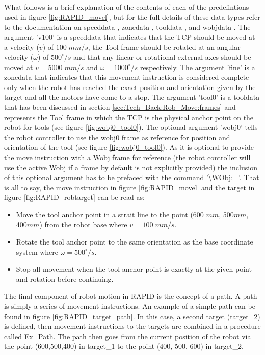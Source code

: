 \documentclass{cslthse-msc}
\begin{document}
What follows is a brief explanation of the contents of each of the predefintions used in figure \ref{fig:RAPID_movel}, but for the full details of these data types refer to the documentation on speeddata \cite[Sec. 3.76]{ABB:rapid_instructions}, zonedata \cite[Sec. 3.103]{ABB:rapid_instructions}, tooldata \cite[Sec. 3.88]{ABB:rapid_instructions}, and wobjdata \cite[Sec. 3.100]{ABB:rapid_instructions}. The argument 'v100' is a speeddata that indicates that the TCP should be moved at a velocity ($v$) of $100 \; mm/s$, the Tool frame should be rotated at an angular velocity ($\omega$) of $500^\circ /s$ and that any linear or rotational external axes should be moved at $v = 5000 \; mm /s$ and $\omega = 1000^\circ /s$ respectively. The argument 'fine' is a zonedata that indicates that this movement instruction is considered complete only when the robot has reached the exact position and orientation given by the target and all the motors have come to a stop. The argument 'tool0' is a tooldata that has been discussed in section \ref{sec:Tech_Back:Rob_Move:frames} and represents the Tool frame in which the TCP is the physical anchor point on the robot for tools (see figure \ref{fig:wobj0_tool0}). The optional argument 'wobj0' tells the robot controller to use the wobj0 frame as reference for position and orientation of the tool (see figure \ref{fig:wobj0_tool0}). As it is optional to provide the move instruction with a Wobj frame for reference (the robot controller will use the active Wobj if a frame by default is not explicitly provided) the inclusion of this optional argument has to be prefaced with the command '\textbackslash WObj:='. That is all to say, the move instruction in figure \ref{fig:RAPID_movel} and the target in figure \ref{fig:RAPID_robtarget} can be read as: 
\begin{itemize}
    \item Move the tool anchor point in a strait line to the point (600 $mm$, 500$mm$, 400$mm$) from the robot base where $v = 100 \; mm /s$. 
    \item Rotate the tool anchor point to the same orientation as the base coordinate system where $\omega = 500^\circ / s$. 
    \item Stop all movement when the tool anchor point is exactly at the given point and rotation before continuing. 
\end{itemize}

The final component of robot motion in RAPID is the concept of a path. A path is simply a series of movement instructions. An example of a simple path can be found in figure \ref{fig:RAPID_target_path}. In this case, a second target (target\_2) is defined, then movement instructions to the targets are combined in a procedure called Ex\_Path. The path then goes from the current position of the robot via the point (600,500,400) in target\_1 to the point (400, 500, 600) in target\_2. 
\end{document}
